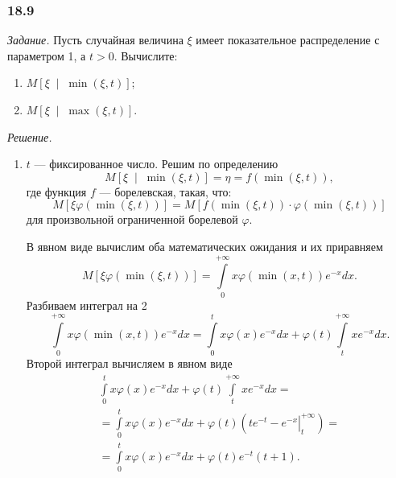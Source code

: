 \subsubsection*{18.9}

\textit{Задание.}
Пусть случайная величина $ \xi $ имеет показательное распределение с параметром 1, а $t > 0$.
Вычислите:
\begin{enumerate}[label=\alph*)]
  \item $M \left[ \xi \; \middle| \; \min \left( \xi, t \right) \right] $;
  \item $M \left[ \xi \; \middle| \; \max \left( \xi, t \right) \right] $.
\end{enumerate}

\textit{Решение.}
\begin{enumerate}[label=\alph*)]
  \item $t$ --- фиксированное число.
  Решим по определению
  $$M \left[ \xi \; \middle| \; \min \left( \xi, t \right) \right] =
    \eta =
    f \left( \min \left( \xi, t \right) \right),$$
  где функция $f$ --- борелевская, такая, что:
  $$M \left[ \xi \varphi \left( \min \left( \xi, t \right) \right) \right] =
    M \left[ f \left( \min \left( \xi, t \right) \right) \cdot
    \varphi \left( \min \left( \xi, t \right) \right) \right] $$
  для произвольной ограниченной борелевой $ \varphi $.

  В явном виде вычислим оба математических ожидания и их приравняем
  $$M \left[ \xi \varphi \left( \min \left( \xi, t \right) \right) \right] =
    \int \limits_0^{+ \infty } x \varphi \left( \min \left( x, t \right) \right) e^{-x} dx.$$
  Разбиваем интеграл на 2
  $$ \int \limits_0^{+ \infty } x \varphi \left( \min \left( x, t \right) \right) e^{-x} dx =
    \int \limits_0^t x \varphi \left( x \right) e^{-x} dx +
    \varphi \left( t \right) \int \limits_t^{+ \infty } xe^{-x} dx.$$
  Второй интеграл вычисляем в явном виде
  \begin{equation*}
    \begin{split}
      \int \limits_0^t x \varphi \left( x \right) e^{-x} dx +
      \varphi \left( t \right) \int \limits_t^{+ \infty } xe^{-x} dx = \\
      = \int \limits_0^t x \varphi \left( x \right) e^{-x} dx +
      \varphi \left( t \right) \left( \left. te^{-t} - e^{-x} \right|_t^{+ \infty } \right) = \\
      = \int \limits_0^t x \varphi \left( x \right) e^{-x} dx +
      \varphi \left( t \right) e^{-t} \left( t + 1 \right).
    \end{split}
  \end{equation*}


\end{enumerate}
